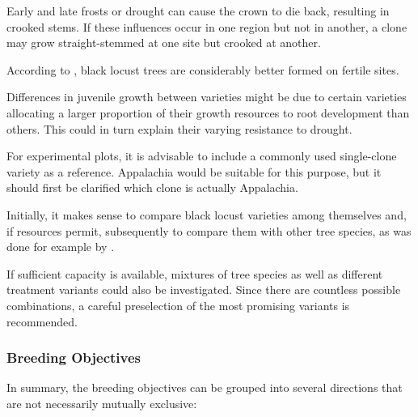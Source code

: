 Early and late frosts or drought can cause the crown to die back, resulting in crooked stems. If these influences occur in one region but not in another, a clone may grow straight-stemmed at one site but crooked at another.

According to \citet[p.~48]{erteld1952robinieErtrag}, black locust trees are considerably better formed on fertile sites.

Differences in juvenile growth between varieties might be due to certain varieties allocating a larger proportion of their growth resources to root development than others. This could in turn explain their varying resistance to drought.

For experimental plots, it is advisable to include a commonly used single-clone variety as a reference. Appalachia would be suitable for this purpose, but it should first be clarified which clone is actually Appalachia.

Initially, it makes sense to compare black locust varieties among themselves and, if resources permit, subsequently to compare them with other tree species, as was done for example by \citet{Gruenewald2009robinie}.

If sufficient capacity is available, mixtures of tree species as well as different treatment variants could also be investigated. Since there are countless possible combinations, a careful preselection of the most promising variants is recommended.

\subsubsection{Breeding Objectives}

In summary, the breeding objectives can be grouped into several directions that are not necessarily mutually exclusive:


